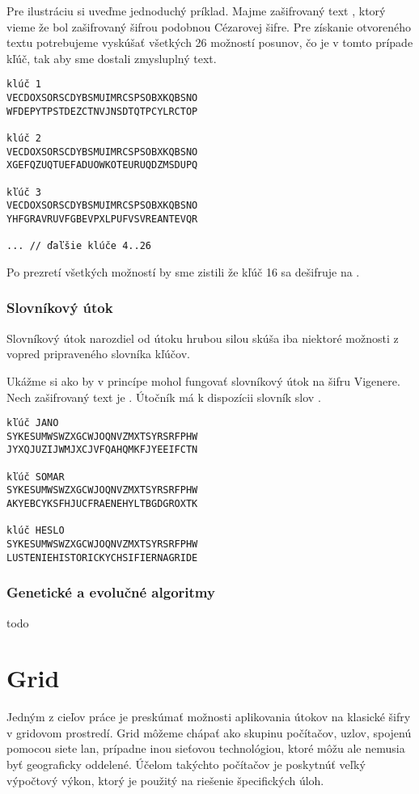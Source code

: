 Pre ilustráciu si uveďme jednoduchý príklad. Majme zašifrovaný text , ktorý vieme že bol zašifrovaný šifrou podobnou Cézarovej šifre.
Pre získanie otvoreného textu potrebujeme vyskúšať všetkých 26 možností posunov, čo je v tomto prípade kľúč, tak aby sme dostali zmysluplný text.

\begin{verbatim}
klúč 1
VECDOXSORSCDYBSMUIMRCSPSOBXKQBSNO
WFDEPYTPSTDEZCTNVJNSDTQTPCYLRCTOP

klúč 2
VECDOXSORSCDYBSMUIMRCSPSOBXKQBSNO
XGEFQZUQTUEFADUOWKOTEURUQDZMSDUPQ

kľúč 3
VECDOXSORSCDYBSMUIMRCSPSOBXKQBSNO
YHFGRAVRUVFGBEVPXLPUFVSVREANTEVQR

... // ďaľšie klúče 4..26
\end{verbatim}

Po prezretí všetkých možností by sme zistili že kľúč 16 sa dešifruje na .


\subsubsection{Slovníkový útok}
Slovníkový útok narozdiel od útoku hrubou silou skúša iba niektoré možnosti z vopred pripraveného slovníka kľúčov.

Ukážme si ako by v princípe mohol fungovať slovníkový útok na šifru Vigenere.
Nech zašifrovaný text je . Útočník má k dispozícii slovník slov .

\begin{verbatim}
kľúč JANO
SYKESUMWSWZXGCWJOQNVZMXTSYRSRFPHW
JYXQJUZIJWMJXCJVFQAHQMKFJYEEIFCTN

kľúč SOMAR
SYKESUMWSWZXGCWJOQNVZMXTSYRSRFPHW
AKYEBCYKSFHJUCFRAENEHYLTBGDGROXTK

klúč HESLO
SYKESUMWSWZXGCWJOQNVZMXTSYRSRFPHW
LUSTENIEHISTORICKYCHSIFIERNAGRIDE
\end{verbatim}

\subsubsection{Genetické a evolučné algoritmy}
todo

\section{Grid}
Jedným z cieľov práce je preskúmať možnosti aplikovania útokov na klasické šifry v gridovom prostredí.
Grid môžeme chápať ako skupinu počítačov, uzlov, spojenú pomocou siete \acrfull{lan}, prípadne inou sieťovou technológiou,
ktoré môžu ale nemusia byť geograficky oddelené.
Účelom takýchto počítačov je poskytnúť veľký výpočtový výkon, ktorý je použitý na riešenie špecifických úloh.

